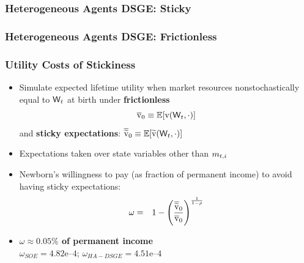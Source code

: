\documentclass{beamer}\usepackage{dcolumn}
\newcommand{\jbemph}[1]{\textbf{\color{SlideNavy}#1}}
\begin{document}
\begin{frame}
\frametitle{Heterogeneous Agents DSGE: Sticky}

\scriptsize


\end{frame}



\begin{frame}
\frametitle{Heterogeneous Agents DSGE: Frictionless}

\scriptsize


\end{frame}






\begin{frame}
\frametitle{Utility Costs of Stickiness}

\begin{itemize}
\item  Simulate expected lifetime utility when market resources nonstochastically equal to $\mathsf{W}_t$ at birth under \jbemph{frictionless}
\begin{equation*}
\overline{\mathrm{v}}_0 \equiv \mathbb{E} [ \mathrm{v}(\mathsf{W}_t,\cdot)]
\end{equation*}
and \jbemph{sticky expectations}:
$ \displaystyle
\overline{\widetilde{\mathrm{v}}}_0 \equiv \mathbb{E} [ \widetilde{\mathrm{v}}(\mathsf{W}_t,\cdot)]
$
\item Expectations taken over state variables other than $m_{t,i}$
\item Newborn's
willingness to pay (as fraction of permanent income) to avoid having
sticky expectations:
\begin{eqnarray*}\label{eq:WTP}
\omega & = & 1 - \left( \frac{\overline{\widetilde{\mathrm{v}}}_0}{\overline{\mathrm{v}}_0} \right)^{\frac{1}{1-\rho}}
\end{eqnarray*}
\item \jbemph{$\omega \approx 0.05\%$ of permanent income}\\
$\omega_{SOE}=4.82\text{e--4}$; $\omega_{HA-DSGE}=4.51\text{e--4}$
\end{itemize}
\end{frame}
\end{document}
